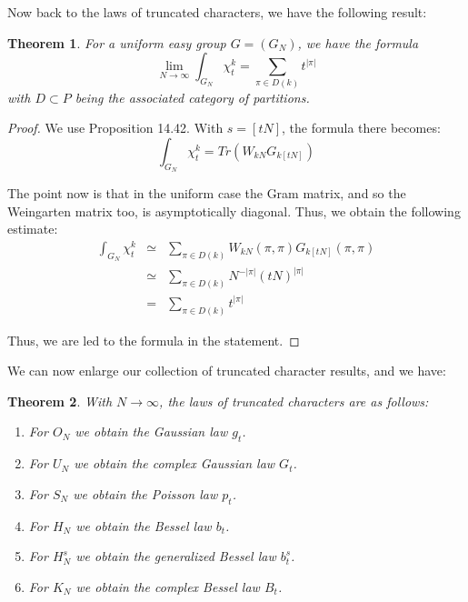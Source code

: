 \documentclass[12pt]{amsbook}
\newtheorem{theorem}{Theorem}[chapter]
\begin{document}
Now back to the laws of truncated characters, we have the following result:


\begin{theorem}
For a uniform easy group $G=(G_N)$, we have the formula
$$\lim_{N\to\infty}\int_{G_N}\chi_t^k=\sum_{\pi\in D(k)}t^{|\pi|}$$
with $D\subset P$ being the associated category of partitions.
\end{theorem}

\begin{proof}
We use Proposition 14.42. With $s=[tN]$, the formula there becomes:
$$\int_{G_N}\chi_t^k=Tr(W_{kN}G_{k[tN]})$$

The point now is that in the uniform case the Gram matrix, and so the Weingarten matrix too, is asymptotically diagonal. Thus, we obtain the following estimate:
\begin{eqnarray*}
\int_{G_N}\chi_t^k
&\simeq&\sum_{\pi\in D(k)}W_{kN}(\pi,\pi)G_{k[tN]}(\pi,\pi)\\
&\simeq&\sum_{\pi\in D(k)}N^{-|\pi|}(tN)^{|\pi|}\\
&=&\sum_{\pi\in D(k)}t^{|\pi|}
\end{eqnarray*}

Thus, we are led to the formula in the statement.
\end{proof}

We can now enlarge our collection of truncated character results, and we have:

\begin{theorem}
With $N\to\infty$, the laws of truncated characters are as follows:
\begin{enumerate}
\item For $O_N$ we obtain the Gaussian law $g_t$.

\item For $U_N$ we obtain the complex Gaussian law $G_t$.

\item For $S_N$ we obtain the Poisson law $p_t$.

\item For $H_N$ we obtain the Bessel law $b_t$.

\item For $H_N^s$ we obtain the generalized Bessel law $b_t^s$.

\item For $K_N$ we obtain the complex Bessel law $B_t$.
\end{enumerate}
\end{theorem}
\end{document}
